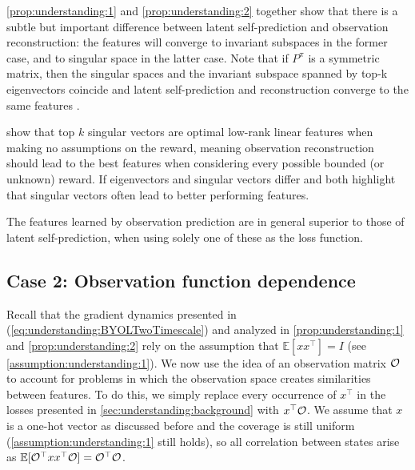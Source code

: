 \autoref{prop:understanding:1} and \autoref{prop:understanding:2} together show that there is a subtle but important difference between latent self-prediction and observation reconstruction: the features will converge to invariant subspaces in the former case, and to singular space in the latter case.
Note that if $P^\pi$ is a symmetric matrix, then the singular spaces and the invariant subspace spanned by top-k eigenvectors coincide and latent self-prediction and reconstruction converge to the same features \parencite{tang2022understanding}.

\textcite{behzadian2019fast} show that top $k$ singular vectors are optimal low-rank linear features when making no assumptions on the reward, meaning observation reconstruction should lead to the best features when considering every possible bounded (or unknown) reward.
If eigenvectors and singular vectors differ \textcite{behzadian2019fast} and \textcite{lelan2023bootstrapped} both highlight that singular vectors often lead to better performing features.

\begin{tcolorbox}[boxrule=0.2mm,colback=white,colframe=uoftblue,boxsep=0pt,top=3pt,bottom=5pt]
\begin{insight} The features learned by observation prediction are in general superior to those of latent self-prediction, when using solely one of these as the loss function.
\label{insight:understanding:1}
\end{insight}
\end{tcolorbox}

\subsection{Case 2: Observation function dependence}
\label{sec:understanding:observation}

Recall that the gradient dynamics presented in (\ref{eq:understanding:BYOLTwoTimescale}) and analyzed in \autoref{prop:understanding:1} and \autoref{prop:understanding:2} rely on the assumption that $\mathbb{E}[xx^\top] = I$ (see \autoref{assumption:understanding:1}).
We now use the idea of an observation matrix ${\mathcal{O}}$ to account for problems in which the observation space creates similarities between features.
To do this, we simply replace every occurrence of $x^\top$ in the losses presented in \autoref{sec:understanding:background} with $x^\top {\mathcal{O}}$.
We assume that $x$ is a one-hot vector as discussed before and the coverage is still uniform (\autoref{assumption:understanding:1} still holds), so all correlation between states arise as $\mathbb{E}[{\mathcal{O}}^\top x x^\top{\mathcal{O}}] = {\mathcal{O}}^\top {\mathcal{O}}$.


